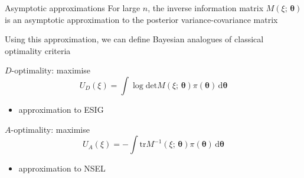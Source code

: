 \documentclass[
  ignorenonframetext,
]{beamer}
\providecommand{\tightlist}{%
  \setlength{\itemsep}{0pt}\setlength{\parskip}{0pt}}
\begin{document}
\begin{frame}{Asymptotic approximations}
\protect\hypertarget{asymptotic-approximations}{}
For large \(n\), the inverse information matrix
\(M(\xi;\,\boldsymbol{\theta})\) is an asymptotic approximation to the
posterior variance-covariance matrix

Using this approximation, we can define Bayesian analogues of classical
optimality criteria

\(D\)-optimality: maximise \[
U_D(\xi) = \int \log\mbox{det} M(\xi;\,\boldsymbol{\theta})\pi(\boldsymbol{\theta})\,\mathrm{d}\boldsymbol{\theta}
\]

\begin{itemize}
\tightlist
\item
  approximation to ESIG
\end{itemize}

\(A\)-optimality: maximise \[
U_A(\xi) = - \int \mbox{tr} M^{-1}(\xi;\,\boldsymbol{\theta})\pi(\boldsymbol{\theta})\,\mathrm{d}\boldsymbol{\theta}
\]

\begin{itemize}
\tightlist
\item
  approximation to NSEL
\end{itemize}
\end{frame}
\end{document}
